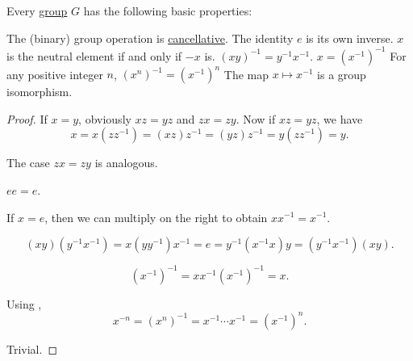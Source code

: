 \begin{proposition}\label{thm:def:group}
  Every \hyperref[def:group]{group} \( G \) has the following basic properties:
  \begin{thmenum}
     The (binary) group operation is \hyperref[def:binary_operation/cancellative]{cancellative}.
     The identity \( e \) is its own inverse.
     \( x \) is the neutral element if and only if \( -x \) is.
     \( (xy)^{-1} = y^{-1} x^{-1} \).
     \( x = (x^{-1})^{-1} \)
     For any positive integer \( n \), \( (x^n)^{-1} = (x^{-1})^n \)
     The map \( x \mapsto x^{-1} \) is a group isomorphism.
  \end{thmenum}
\end{proposition}
\begin{proof}
   If \( x = y \), obviously \( xz = yz \) and \( zx = zy \). Now if \( xz = yz \), we have
  \begin{equation*}
    x = x(zz^{-1}) = (xz)z^{-1} = (yz)z^{-1} = y(zz^{-1}) = y.
  \end{equation*}

  The case \( zx = zy \) is analogous.

   \( ee = e \).

   If \( x = e \), then we can multiply on the right to obtain \( xx^{-1} = x^{-1} \).

  \begin{equation*}
    (xy) (y^{-1} x^{-1})
    =
    x (y y^{-1}) x^{-1}
    =
    e
    =
    y^{-1} (x^{-1} x) y
    =
    (y^{-1} x^{-1}) (xy).
  \end{equation*}

  \begin{equation*}
    (x^{-1})^{-1}
    =
    x x^{-1} (x^{-1})^{-1}
    =
    x.
  \end{equation*}

   Using ,
  \begin{equation*}
    x^{-n}
    =
    (x^n)^{-1}
    =
    x^{-1} \cdots x^{-1}
    =
    (x^{-1})^n.
  \end{equation*}

   Trivial.
\end{proof}

